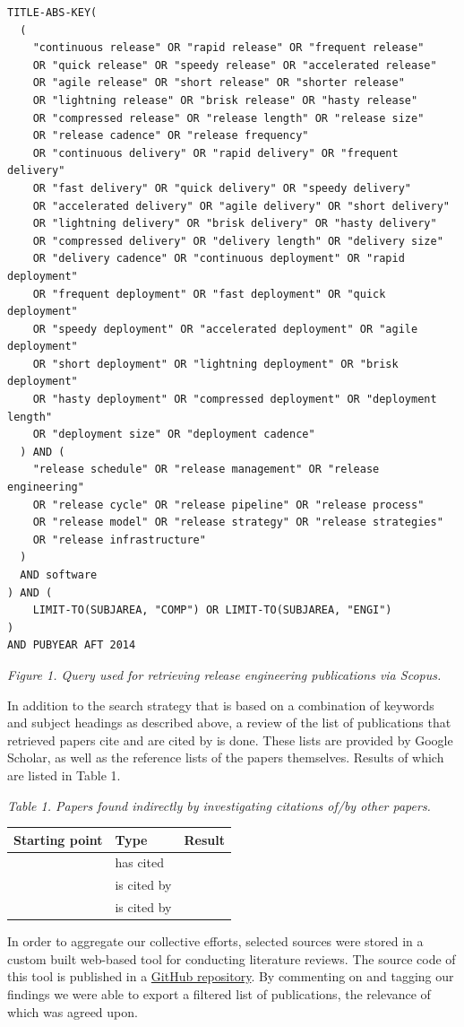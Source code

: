 \documentclass[]{book}
\begin{document}
\begin{verbatim}
TITLE-ABS-KEY(
  (
    "continuous release" OR "rapid release" OR "frequent release"
    OR "quick release" OR "speedy release" OR "accelerated release"
    OR "agile release" OR "short release" OR "shorter release"
    OR "lightning release" OR "brisk release" OR "hasty release"
    OR "compressed release" OR "release length" OR "release size"
    OR "release cadence" OR "release frequency"
    OR "continuous delivery" OR "rapid delivery" OR "frequent delivery"
    OR "fast delivery" OR "quick delivery" OR "speedy delivery"
    OR "accelerated delivery" OR "agile delivery" OR "short delivery"
    OR "lightning delivery" OR "brisk delivery" OR "hasty delivery"
    OR "compressed delivery" OR "delivery length" OR "delivery size"
    OR "delivery cadence" OR "continuous deployment" OR "rapid deployment"
    OR "frequent deployment" OR "fast deployment" OR "quick deployment"
    OR "speedy deployment" OR "accelerated deployment" OR "agile deployment"
    OR "short deployment" OR "lightning deployment" OR "brisk deployment"
    OR "hasty deployment" OR "compressed deployment" OR "deployment length"
    OR "deployment size" OR "deployment cadence"
  ) AND (
    "release schedule" OR "release management" OR "release engineering"
    OR "release cycle" OR "release pipeline" OR "release process"
    OR "release model" OR "release strategy" OR "release strategies"
    OR "release infrastructure"
  )
  AND software
) AND (
    LIMIT-TO(SUBJAREA, "COMP") OR LIMIT-TO(SUBJAREA, "ENGI")
)
AND PUBYEAR AFT 2014
\end{verbatim}

\emph{Figure 1. Query used for retrieving release engineering
publications via Scopus.}

In addition to the search strategy that is based on a combination of
keywords and subject headings as described above, a review of the list
of publications that retrieved papers cite and are cited by is done.
These lists are provided by Google Scholar, as well as the reference
lists of the papers themselves. Results of which are listed in Table 1.

\emph{Table 1. Papers found indirectly by investigating citations of/by
other papers.}

\begin{longtable}[]{@{}lll@{}}
\toprule
Starting point & Type & Result\tabularnewline
\midrule
\endhead
\citet{souza2015a} & has cited & \citet{plewnia2014a}
\citet{mantyla2015a}\tabularnewline
\citet{khomh2015a} & is cited by & \citet{poo-caama2016a}
\citet{teixeira2017a}\tabularnewline
\citet{mantyla2015a} & is cited by & \citet{rodriguez2017a}
\citet{cesar2017a}\tabularnewline
\bottomrule
\end{longtable}

In order to aggregate our collective efforts, selected sources were
stored in a custom built web-based tool for conducting literature
reviews. The source code of this tool is published in a
\href{https://github.com/jessetilro/research}{GitHub repository}. By
commenting on and tagging our findings we were able to export a filtered
list of publications, the relevance of which was agreed upon.


\end{document}
